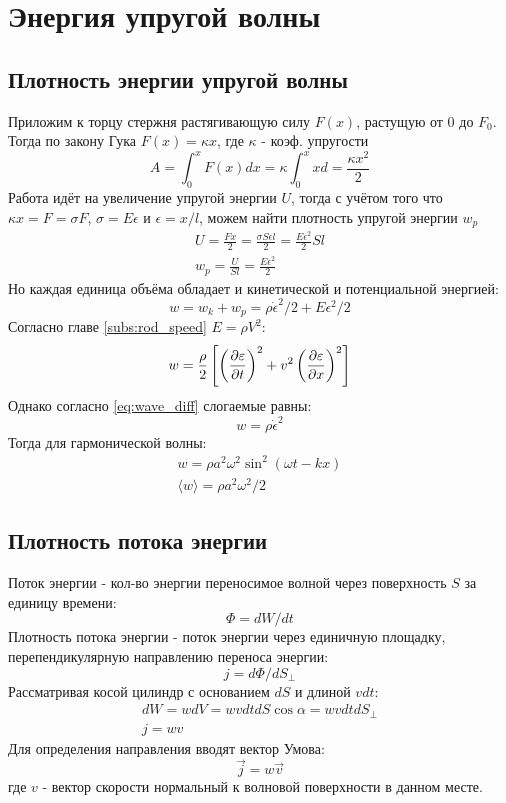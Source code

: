 \documentclass{article}
\begin{document}
\section{Энергия упругой волны}
\subsection{Плотность энергии упругой волны}
Приложим к торцу стержня растягивающую силу $F(x)$, растущую от $0$ до $F_0$.
Тогда по закону Гука $F(x)=\kappa x$, где $\kappa$ - коэф. упругости
\[
  A=\int_{0}^{x}F(x)dx=\kappa\int_{0}^{x}xd=\frac{\kappa x^{2}}{2}
\]
Работа идёт на увеличение упругой энергии $U$, тогда с учётом того что
$\kappa x=F=\sigma F$, $\sigma=E\epsilon$ и $\epsilon=x/l$, можем найти
плотность упругой энергии $w_p$
\begin{gather*}
  U=\frac{Fx}{2}=\frac{\sigma S\epsilon l}{2}=\frac{E \epsilon^{2}}{2}Sl \\ 
  w_p=\frac{U}{Sl}=\frac{E\epsilon^{2}}{2}
\end{gather*}
Но каждая единица объёма обладает и кинетической и потенциальной энергией:
\[
  w=w_k+w_p=\rho \dot{\epsilon}^{2}/2 + E \epsilon^{2}/2
\]
Согласно главе \ref{subs:rod_speed}
$E=\rho V^{2}$:
\[
  w=\frac{\rho}{2}\left[\left(\frac{\partial{\varepsilon}}{\partial{t}}\right)^{2}+v^{2}\left(\frac{\partial{\varepsilon}}{\partial{x}}\right)^{2}\right]
\]
Однако согласно \ref{eq:wave_diff} слогаемые равны:
\[
  w=\rho \dot{\epsilon}^{2}
\]
Тогда для гармонической волны:
\begin{gather*}
  w=\rho a^{2}\omega^{2}\sin^{2}(\omega t - kx) \\ 
  \langle w \rangle = \rho a^{2} \omega^{2} / 2
\end{gather*}

\subsection{Плотность потока энергии}
Поток энергии - кол-во энергии переносимое волной
через поверхность $S$ за единицу времени:
\[
  \Phi=dW/dt
\]
Плотность потока энергии - поток энергии через единичную площадку,
перепендикулярную направлению переноса энергии:
\[
  j=d\Phi/dS_\perp
\]
Рассматривая косой цилиндр с основанием $dS$ и длиной $vdt$:
\begin{gather*}
  dW=wdV=wvdtdS\cos\alpha=wvdtdS_\perp \\ 
  j = wv
\end{gather*}
Для определения направления вводят вектор Умова:
\[
  \vec{j}=w\vec{v}
\]
где $v$ - вектор скорости нормальный к волновой поверхности в данном месте.
\end{document}
